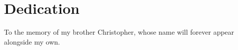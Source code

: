 \chapter*{Dedication}

\par To the memory of my brother Christopher, whose name will forever appear alongside my own.

